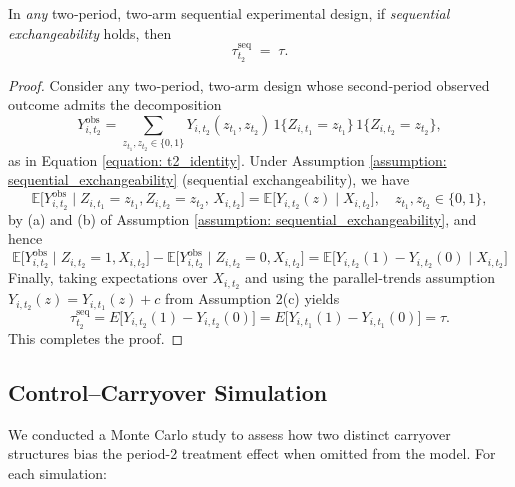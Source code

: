 \begin{recor}
    In \emph{any} two‐period, two‐arm sequential experimental design, if \emph{sequential exchangeability}
  holds, then
  \[
    \tau_{t_2}^{\mathrm{seq}} \;=\; \tau.
  \]
\end{recor}


\begin{proof}
  Consider any two‐period, two‐arm design whose second‐period observed outcome admits the decomposition
  \[
    Y^{\mathrm{obs}}_{i,t_2}
    = \sum_{z_{t_1},z_{t_2}\in\{0,1\}}
      Y_{i,t_2}(z_{t_1},z_{t_2})
      \,1\{Z_{i,t_1}=z_{t_1}\}\,1\{Z_{i,t_2}=z_{t_2}\},
  \]
  as in Equation \ref{equation: t2_identity}. Under Assumption \ref{assumption: sequential_exchangeability} (sequential exchangeability), we have
  \[
    \mathbb{E}\bigl[Y^{\mathrm{obs}}_{i,t_2}\mid Z_{i,t_1}=z_{t_1}, Z_{i,t_2}=z_{t_2},\,X_{i,t_2}\bigr]
    = \mathbb{E}\bigl[Y_{i,t_2}(z)\mid X_{i,t_2}\bigr],
    \quad z_{t_1}, z_{t_2}\in\{0,1\},
  \]
  by (a) and (b) of Assumption \ref{assumption: sequential_exchangeability}, and hence
  \[
      \mathbb{E}\bigl[Y^{\mathrm{obs}}_{i,t_2}\mid Z_{i,t_2}=1,X_{i,t_2}\bigr]
      -\mathbb{E}\bigl[Y^{\mathrm{obs}}_{i,t_2}\mid Z_{i,t_2}=0,X_{i,t_2}\bigr] = \mathbb{E}\bigl[Y_{i,t_2}(1)-Y_{i,t_2}(0)\mid X_{i,t_2}\bigr]
  \]
  Finally, taking expectations over \(X_{i,t_2}\) and using the parallel‐trends assumption \(Y_{i,t_2}(z)=Y_{i,t_1}(z)+c\) from Assumption 2(c) yields
  \[
    \tau^{\mathrm{seq}}_{t_2}
    = E\bigl[Y_{i,t_2}(1)-Y_{i,t_2}(0)\bigr]
    = E\bigl[Y_{i,t_1}(1)-Y_{i,t_1}(0)\bigr]
    = \tau.
  \]
  This completes the proof.
\end{proof}


\subsection*{Control–Carryover Simulation}

We conducted a Monte Carlo study to assess how two distinct carryover structures bias the period-2 treatment effect when omitted from the model.  For each simulation:

